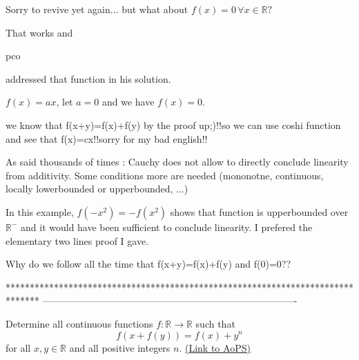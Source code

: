 \begin{solution}
	\begin{tcolorbox}Sorry to revive yet again... but what about $f(x) = 0 \, \forall x \in \mathbb{R}?$\end{tcolorbox}

That works and \begin{bolded}pco\end{bolded} addressed that function in his solution.

$f(x)=ax$, let $a=0$ and we have $f(x)=0$.
\end{solution}



\begin{solution}
	\begin{tcolorbox}we know that f(x+y)=f(x)+f(y) by the proof up;)!!so we can use coshi function and see that f(x)=cx!!sorry for my bad english!!\end{tcolorbox}

As said thousands of times : Cauchy does not allow to directly conclude linearity from additivity.
Some conditions more are needed (mononotne, continuous, locally lowerbounded or upperbounded, ...)

In this example, $f(-x^2)=-f(x^2)$ shows that function is upperbounded over $\mathbb R^-$ and it would have been sufficient to conclude linearity. I prefered the elementary two lines proof I gave.


\end{solution}



\begin{solution}
	Why do we follow all the time that f(x+y)=f(x)+f(y) and f(0)=0??
\end{solution}
*******************************************************************************
-------------------------------------------------------------------------------

\begin{problem}
	Determine all continuous functions $f: \mathbb R \to \mathbb R$ such that
\[ f(x + f(y)) = f(x) +y^n\]
for all $x,y \in \mathbb R$ and all positive integers $n$.
	\flushright \href{https://artofproblemsolving.com/community/c6h320304}{(Link to AoPS)}
\end{problem}



